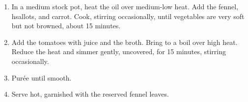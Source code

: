 
\begin{ingredients}
\end{ingredients}


\begin{recipe}
  \begin{enumerate}

  \item In a medium stock pot, heat the oil over medium-low heat.  Add
    the fennel, hsallots, and carrot.  Cook, stirring occasionally,
    until vegetables are very soft but not browned, about 15 minutes.

  \item Add the tomatoes with juice and the broth.  Bring to a boil
    over high heat.  Reduce the heat and simmer gently, uncovered, for
    15 minutes, stirring occasionally.

  \item Pur\'ee until smooth.

  \item Serve hot, garnished with the reserved fennel leaves.

  \end{enumerate}
\end{recipe}
